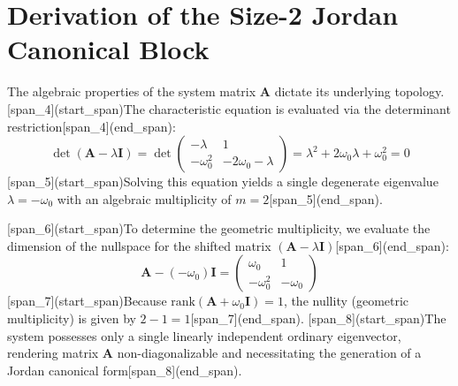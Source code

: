 \documentclass[12pt,letterpaper]{article}
\theoremstyle{definition}
\begin{document}
\section{Derivation of the Size-2 Jordan Canonical Block}
The algebraic properties of the system matrix $\mathbf{A}$ dictate its underlying topology. [span_4](start_span)The characteristic equation is evaluated via the determinant restriction[span_4](end_span):
\begin{equation}
    \det(\mathbf{A} - \lambda \mathbf{I}) = \det\begin{pmatrix} -\lambda & 1 \\ -\omega_{0}^{2} & -2\omega_{0}-\lambda \end{pmatrix} = \lambda^{2} + 2\omega_{0}\lambda + \omega_{0}^{2} = 0
\end{equation}
[span_5](start_span)Solving this equation yields a single degenerate eigenvalue $\lambda = -\omega_{0}$ with an algebraic multiplicity of $m = 2$[span_5](end_span).

[span_6](start_span)To determine the geometric multiplicity, we evaluate the dimension of the nullspace for the shifted matrix $(\mathbf{A} - \lambda \mathbf{I})$[span_6](end_span):
\begin{equation}
    \mathbf{A} - (-\omega_{0})\mathbf{I} = \begin{pmatrix} \omega_{0} & 1 \\ -\omega_{0}^{2} & -\omega_{0} \end{pmatrix}
\end{equation}
[span_7](start_span)Because $\text{rank}(\mathbf{A} + \omega_{0}\mathbf{I}) = 1$, the nullity (geometric multiplicity) is given by $2 - 1 = 1$[span_7](end_span). [span_8](start_span)The system possesses only a single linearly independent ordinary eigenvector, rendering matrix $\mathbf{A}$ non-diagonalizable and necessitating the generation of a Jordan canonical form[span_8](end_span).
\end{document}
